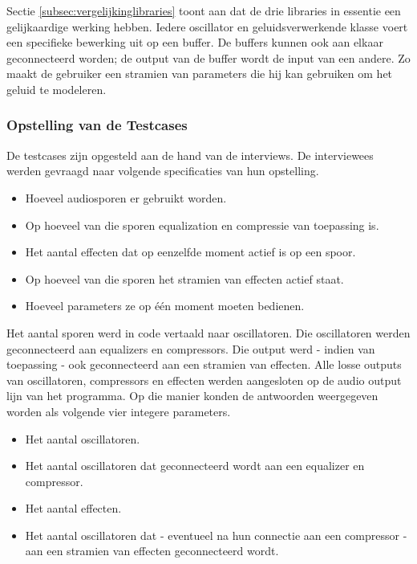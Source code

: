 Sectie \ref{subsec:vergelijkinglibraries} toont aan dat de drie libraries in essentie een gelijkaardige werking hebben. Iedere oscillator en geluidsverwerkende klasse voert een specifieke bewerking uit op een buffer. De buffers kunnen ook aan elkaar geconnecteerd worden; de output van de buffer wordt de input van een andere. Zo maakt de gebruiker een stramien van parameters die hij kan gebruiken om het geluid te modeleren.

\subsubsection{Opstelling van de Testcases}

De testcases zijn opgesteld aan de hand van de interviews. De interviewees werden gevraagd naar volgende specificaties van hun opstelling. 

\begin{itemize}
	\item Hoeveel audiosporen er gebruikt worden.
	\item Op hoeveel van die sporen equalization en compressie van toepassing is.
	\item Het aantal effecten dat op eenzelfde moment actief is op een spoor.
	\item Op hoeveel van die sporen het stramien van effecten actief staat.
	\item Hoeveel parameters ze op één moment moeten bedienen.
\end{itemize}

Het aantal sporen werd in code vertaald naar oscillatoren. Die oscillatoren werden geconnecteerd aan equalizers en compressors. Die output werd - indien van toepassing - ook geconnecteerd aan een stramien van effecten. Alle losse outputs van oscillatoren, compressors en effecten werden aangesloten op de audio output lijn van het programma. Op die manier konden de antwoorden weergegeven worden als volgende vier integere parameters.

\begin{itemize}
	\item Het aantal oscillatoren.
	\item Het aantal oscillatoren dat geconnecteerd wordt aan een equalizer en compressor.
	\item Het aantal effecten.
	\item Het aantal oscillatoren dat - eventueel na hun connectie aan een compressor - aan een stramien van effecten geconnecteerd wordt.
\end{itemize}

